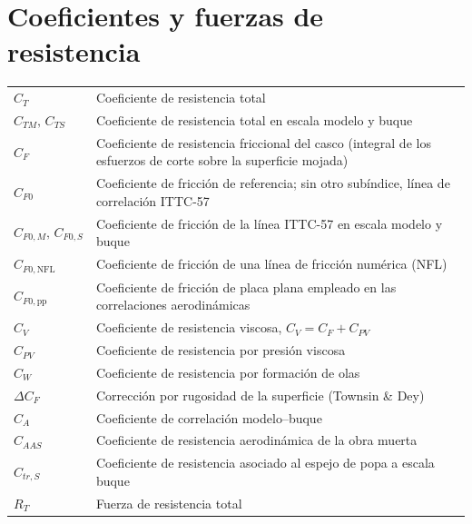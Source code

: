 
\section*{Coeficientes y fuerzas de resistencia}
\begin{longtable}{@{}p{} p{}@{}}
$C_T$              & Coeficiente de resistencia total \\
$C_{TM},\,C_{TS}$  & Coeficiente de resistencia total en escala modelo y buque \\
$C_F$              & Coeficiente de resistencia friccional del casco (integral de los esfuerzos de corte sobre la superficie mojada) \\
$C_{F0}$           & Coeficiente de fricción de referencia; sin otro subíndice, línea de correlación ITTC-57 \\
$C_{F0,M},\,C_{F0,S}$& Coeficiente de fricción de la línea ITTC-57 en escala modelo y buque \\
$C_{F0,\mathrm{NFL}}$ & Coeficiente de fricción de una línea de fricción numérica (NFL) \\
$C_{F0,\mathrm{pp}}$ & Coeficiente de fricción de placa plana empleado en las correlaciones aerodinámicas \\
$C_V$              & Coeficiente de resistencia viscosa, $C_V = C_F + C_{PV}$ \\
$C_{PV}$           & Coeficiente de resistencia por presión viscosa \\
$C_W$              & Coeficiente de resistencia por formación de olas \\
$\Delta C_F$       & Corrección por rugosidad de la superficie (Townsin \& Dey) \\
$C_A$              & Coeficiente de correlación modelo--buque \\
$C_{AAS}$          & Coeficiente de resistencia aerodinámica de la obra muerta \\
$C_{tr,S}$         & Coeficiente de resistencia asociado al espejo de popa a escala buque \\
$R_T$              & Fuerza de resistencia total \\

\end{longtable}
